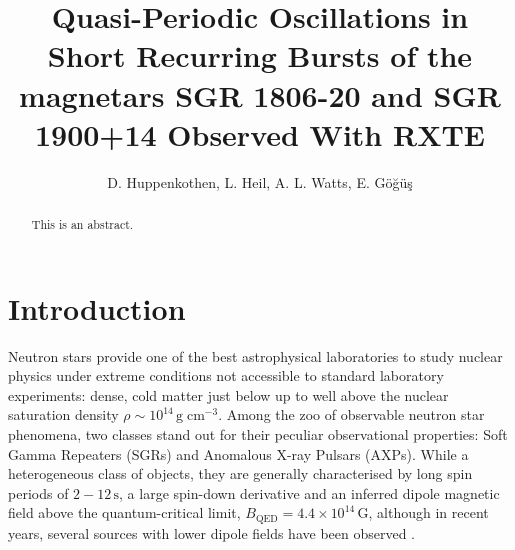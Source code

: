 \documentclass[numberedappendix]{emulateapj}
\begin{document}
\title{Quasi-Periodic Oscillations in Short Recurring Bursts of the magnetars SGR 1806-20 and SGR 1900+14 Observed With RXTE}

\author{D. Huppenkothen, L. Heil, A. L. Watts,  E. G{\"o}{\u g}{\"u}{\c s}}

 


\begin{abstract}
This is an abstract. 
\end{abstract}
\begin{abstract}
\end{abstract} 



\section{Introduction}

Neutron stars provide one of the best astrophysical laboratories to study nuclear physics under extreme conditions not accessible to standard laboratory experiments: dense, cold matter just below up to well above the nuclear saturation density $\rho \sim 10^14 \, \mathrm{g}\; \mathrm{cm}^{-3}$.
Among the zoo of observable neutron star phenomena, two classes stand out for their peculiar observational properties: Soft Gamma Repeaters (SGRs) and Anomalous X-ray Pulsars (AXPs).
While a heterogeneous class of objects, they are generally characterised by long spin periods of $2 - 12 \, \mathrm{s}$, a large spin-down derivative and an inferred dipole magnetic field above the quantum-critical limit, $B_{\mathrm{QED}} = 4.4 \times 10^{14} \, \mathrm{G}$, although in recent years, several sources with lower dipole fields have been observed \citep{vanderhorst2010,esposito2010,rea2010,rea2012,scholz2012,rea2014}. 
\end{document}
